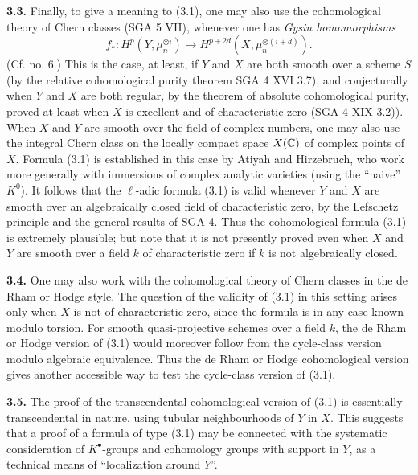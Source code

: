 \textbf{3.3.} Finally, to give a meaning to (3.1), one may also use the cohomological theory of Chern classes (SGA 5 VII), whenever one has \emph{Gysin homomorphisms}
\[
  f_*:H^p(Y,\mu_n^{\otimes i})
  \longrightarrow H^{p+2d}(X,\mu_n^{\otimes(i+d)}).
\]
(Cf. no. 6.) This is the case, at least, if $Y$ and $X$ are both smooth
over a scheme $S$ (by the relative cohomological purity theorem
SGA 4 XVI 3.7), and
conjecturally when $Y$ and $X$ are both regular, by the theorem of absolute
cohomological purity, proved at least when $X$ is excellent and of
characteristic zero (SGA 4 XIX 3.2)). When $X$ and $Y$ are smooth over the
field of complex numbers, one may also use the integral Chern class on the
locally compact space $X(\mathbb C)$ of complex points of $X$. Formula (3.1) is
established in this case by Atiyah and Hirzebruch, who work more generally
with immersions of complex analytic varieties (using the ``naive''
$K^0$). It follows that the $\ell$-adic formula (3.1) is valid whenever $Y$
and $X$ are smooth over an algebraically closed field of characteristic
zero, by the Lefschetz principle and the general results of SGA 4. Thus the
cohomological formula (3.1) is extremely plausible; but note that it is not
presently proved even when $X$ and $Y$ are smooth over a field $k$ of
characteristic zero if $k$ is not algebraically closed.

\textbf{3.4.} One may also work with the cohomological theory of Chern
classes in the de Rham or Hodge style. The question of the validity of
(3.1) in this setting arises only when $X$ is not of characteristic zero,
since the formula is in any case known modulo torsion. For smooth
quasi-projective schemes over a field $k$, the de Rham or Hodge version of
(3.1) would moreover follow from the cycle-class version modulo algebraic
equivalence. Thus the de Rham or Hodge cohomological version gives another
accessible way to test the cycle-class version of (3.1).

\textbf{3.5.} The proof of the transcendental cohomological version of
(3.1) is essentially transcendental in nature, using tubular neighbourhoods
of $Y$ in $X$. This suggests that a proof of a formula of type (3.1) may be
connected with the systematic consideration of $K^\bullet$-groups and
cohomology groups with support in $Y$, as a technical means of
``localization around $Y$''.

